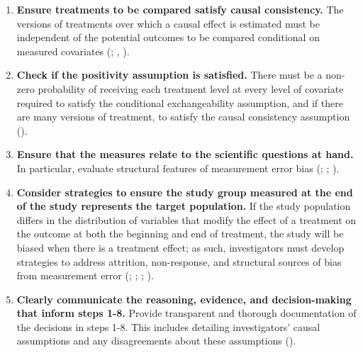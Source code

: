\documentclass[
  single column]{article}
\begin{document}
\begin{enumerate}
  ;
  ;
  ).
\item
  \textbf{Ensure treatments to be compared satisfy causal consistency.}
  The versions of treatments over which a causal effect is estimated
  must be independent of the potential outcomes to be compared
  conditional on measured covariates
  (;
  ,
  ).
\item
  \textbf{Check if the positivity assumption is satisfied.} There must
  be a non-zero probability of receiving each treatment level at every
  level of covariate required to satisfy the conditional exchangeability
  assumption, and if there are many versions of treatment, to satisfy
  the causal consistency assumption
  ().
\item
  \textbf{Ensure that the measures relate to the scientific questions at
  hand.} In particular, evaluate structural features of measurement
  error bias (;
  ;
  ).
\item
  \textbf{Consider strategies to ensure the study group measured at the
  end of the study represents the target population.} If the study
  population differs in the distribution of variables that modify the
  effect of a treatment on the outcome at both the beginning and end of
  treatment, the study will be biased when there is a treatment effect;
  as such, investigators must develop strategies to address attrition,
  non-response, and structural sources of bias from measurement error
  (;
  ;
  ;
  ).
\item
  \textbf{Clearly communicate the reasoning, evidence, and
  decision-making that inform steps 1-8.} Provide transparent and
  thorough documentation of the decisions in steps 1-8. This includes
  detailing investigators' causal assumptions and any disagreements
  about these assumptions ().
\end{enumerate}
\end{document}
